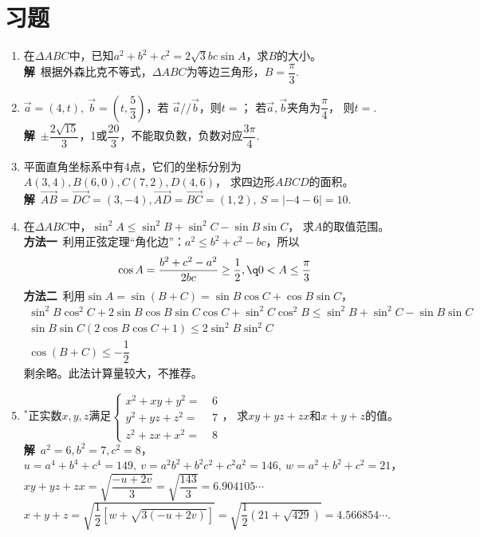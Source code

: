 \section{习题}
\begin{enumerate}[leftmargin=\inteval{\myenumleftmargin}pt]
\item 在$ \Delta ABC $中，已知$ a^2+b^2+c^2=2\sqrt{3}bc\sin A $，求$ B $的大小。
\ifteach \\ \textbf{解}\ 
根据外森比克不等式，$ \Delta ABC $为等边三角形，$ B=\dfrac{\pi}{3} $. 
\fi

\item $ \vec{a}=(4,t),\ \vec{b}=(t,\dfrac{5}{3}) $，若
$ \vec{a}//\vec{b} $，则$ t= $\underline{\hspace{2cm}}；
若$ \vec{a},\vec{b} $夹角为$ \dfrac{\pi}{4} $，
则$ t= $\underline{\hspace{2cm}}.
\ifteach \\ \textbf{解}\ 
$ \pm\dfrac{2\sqrt{15}}{3} $，1或$ \dfrac{20}{3} $，不能取负数，负数对应$ \dfrac{3\pi}{4} $. 
\fi

\item 平面直角坐标系中有4点，它们的坐标分别为$ A(3,4),B(6,0),C(7,2),D(4,6) $，
求四边形$ ABCD $的面积。
\ifteach \\
\textbf{解}\ $ \vec{AB}=\vec{DC}=(3,-4),
\vec{AD}=\vec{BC}=(1,2),\ S=|-4-6|=10 $. 
\fi

\item 在$ \Delta ABC $中，$ \sin^2A\leq\sin^2B+\sin^2C-\sin B\sin C $，
求$ A $的取值范围。\\
\textbf{方法一}\ 利用正弦定理“角化边”：$ a^2\leq b^2+c^2-bc $，所以
\begin{gather*}
    \cos A=\dfrac{b^2+c^2-a^2}{2bc}\geq \dfrac{1}{2},
    \q 0<A\leq \dfrac{\pi}{3}
\end{gather*}
\textbf{方法二}\ 利用$ \sin A=\sin(B+C)=\sin B\cos C+\cos B\sin C $，
\begin{gather*}
    \sin^2B\cos^2C+2\sin B\cos B\sin C\cos C+\sin^2C\cos^2B
    \leq \sin^2B+\sin^2C-\sin B\sin C \\
    \sin B\sin C(2\cos B\cos C+1)\leq 2\sin^2B \sin^2C \\
    \cos(B+C)\leq -\dfrac{1}{2} 
\end{gather*}
剩余略。此法计算量较大，不推荐。

\item $ ^* $正实数$ x,y,z $满足$ \left\{ \begin{aligned} x^2+xy+y^2 =&\ 6 \\
    y^2+yz+z^2=&\ 7  \\
    z^2+zx+x^2=&\ 8  \end{aligned} \right. $，
求$ xy+yz+zx $和$ x+y+z $的值。
\ifteach \\ \textbf{解}\ 
$ a^2=6,b^2=7,c^2=8 $，\\
$ u=a^4+b^4+c^4=149,\ v=a^2b^2+b^2c^2+c^2a^2=146 ,\ w=a^2+b^2+c^2=21 $，\\
$ xy+yz+zx=\sqrt{\dfrac{-u+2v}{3}}=\sqrt{\dfrac{143}{3}}=6.904105\cdots $ \\
$ x+y+z=\sqrt{\dfrac{1}{2}[w+\sqrt{3(-u+2v)}]}=
\sqrt{\dfrac{1}{2}(21+\sqrt{429})}=4.566854\cdots $. 
\fi


\end{enumerate}

